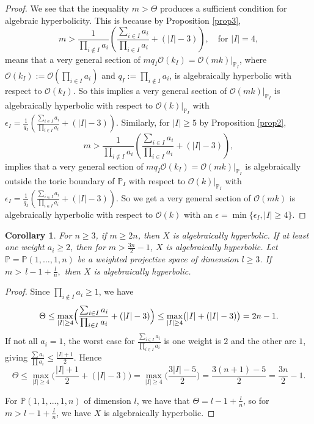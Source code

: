 \documentclass{amsart}
\newtheorem{corollary}[theorem]{Corollary}
\theoremstyle{definition}
\theoremstyle{remark}
\begin{document}
\begin{proof}
We see that the inequality $m>\Theta$ produces a sufficient condition for algebraic hyperbolicity. This is because by Proposition \ref{prop3},
\[
m > \frac{1}{\prod_{i\notin I}a_i}(\frac{\sum_{i \in I} a_i}{\prod_{i\in I} a_i} + (|I|-3)), \quad \text{for } |I|=4,
\] 
means that a very general section of $mq_I\mathcal O(k_I)  = \mathcal O(mk)|_{\mathbb{P}_I}$, where $\mathcal O(k_I):= \mathcal O(\prod_{i\in I} a_i)$ and $q_I := \prod_{i \notin I} a_i$, is algebraically hyperbolic with respect to $\mathcal O(k_I)$. So this implies a very general section of $\mathcal O(mk)|_{\mathbb{P}_I}$ is algebraically hyperbolic with respect to $\mathcal O(k)|_{\mathbb{P}_I}$ with $\epsilon_I = \frac 1{q_I}(\frac{\sum_{i \in I} a_i}{\prod_{i\in I} a_i} + (|I|-3))$. Similarly, for $|I|\geq5$ by Proposition \ref{prop2},
\[
m >  \frac{1}{\prod_{i\notin I}a_i}(\frac{\sum_{i \in I} a_i}{\prod_{i\in I} a_i} + (|I|-3)),
\] 
implies that a very general section of $mq_I\mathcal O(k_I)  = \mathcal O(mk)|_{\mathbb{P}_I}$ is algebraically outside the toric boundary of $\mathbb P_I$ with respect to $\mathcal O(k)|_{\mathbb{P}_I}$ with $\epsilon_I = \frac 1{q_I}(\frac{\sum_{i \in I} a_i}{\prod_{i\in I} a_i} + (|I|-3))$. So we get a very general section of $\mathcal O(mk)$ is algebraically hyperbolic with respect to $\mathcal O(k)$ with an $\epsilon = \operatorname{min}\{\epsilon_I, |I|\geq4\}$.
   
\end{proof}

\begin{corollary}\label{cor:uniform}
For $n\ge3$, if $m\ge 2n$, then 
$X$ is algebraically hyperbolic. If at least one weight $a_i\ge2$, then
for $m> \frac{3n}{2}-1$, $X$ is algebraically hyperbolic. Let $\mathbb{P}=\mathbb{P}(1,\ldots,1,n)$ be a weighted projective space of dimension $l\ge3$. If $
m>\,l-1+\frac{l}{n},$
then $X$ is algebraically hyperbolic.
\end{corollary}

\begin{proof}
Since $\prod_{i\notin I}a_i\ge1$, we have
\[
\Theta \le \max_{|I|\ge4}\Bigl(\frac{\sum_{i\in I}a_i}{\prod_{i\in I}a_i}+(|I|-3)\Bigr)
\le \max_{|I|\ge4}\bigl(|I|+(|I|-3)\bigr)=2n-1.
\]
If not all $a_i=1$, the worst case for $\frac{\sum_{i\in I}a_i}{\prod_{i\in I}a_i}$ is
one weight is $2$ and the other are $1$, giving
$\frac{\sum a_i}{\prod a_i}\le\frac{|I|+1}{2}$. Hence
\[
\Theta \le \max_{|I|\ge4}\bigl(\frac{|I|+1}{2}+(|I|-3)\bigr) = \max_{|I|\ge4}\bigl(\frac{3|I|-5}{2}\bigr)
= \frac{3(n+1)-5}{2}=\frac{3n}{2}-1.
\]

For $\mathbb P(1,1,...,1,n)$ of dimension $l$, we have that $\Theta = l-1+\frac l n$, so for $m> l-1+\frac ln$, we have $X$ is algebraically hyperbolic.
\end{proof}
\end{document}
